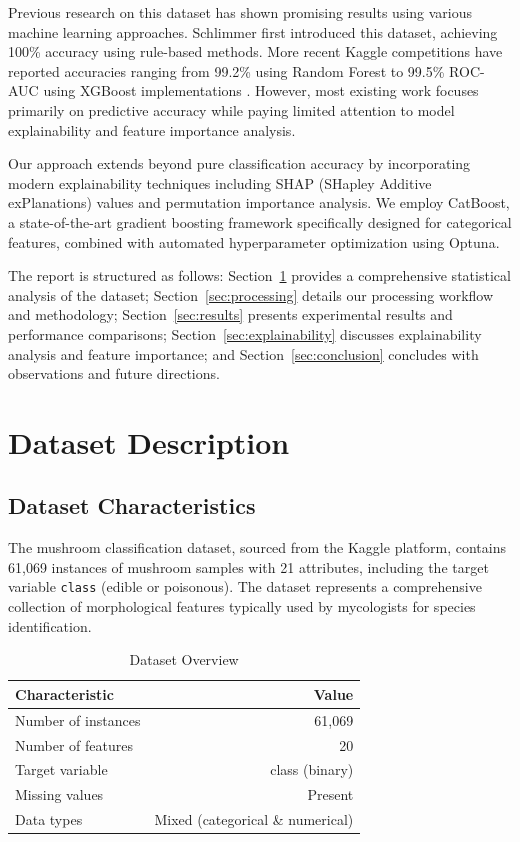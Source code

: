 \documentclass[11pt,a4paper]{article}
\begin{document}
Previous research on this dataset has shown promising results using various machine learning approaches. Schlimmer \cite{schlimmer1987concept} first introduced this dataset, achieving 100\% accuracy using rule-based methods. More recent Kaggle competitions have reported accuracies ranging from 99.2\% using Random Forest \cite{kaggle2019mushroom} to 99.5\% ROC-AUC using XGBoost implementations \cite{chen2016xgboost}. However, most existing work focuses primarily on predictive accuracy while paying limited attention to model explainability and feature importance analysis.

Our approach extends beyond pure classification accuracy by incorporating modern explainability techniques including SHAP (SHapley Additive exPlanations) values and permutation importance analysis. We employ CatBoost, a state-of-the-art gradient boosting framework specifically designed for categorical features, combined with automated hyperparameter optimization using Optuna.

The report is structured as follows: Section~\ref{sec:dataset} provides a comprehensive statistical analysis of the dataset; Section~\ref{sec:processing} details our processing workflow and methodology; Section~\ref{sec:results} presents experimental results and performance comparisons; Section~\ref{sec:explainability} discusses explainability analysis and feature importance; and Section~\ref{sec:conclusion} concludes with observations and future directions.

\section{Dataset Description}
\label{sec:dataset}

\subsection{Dataset Characteristics}

The mushroom classification dataset, sourced from the Kaggle platform, contains 61,069 instances of mushroom samples with 21 attributes, including the target variable \texttt{class} (edible or poisonous). The dataset represents a comprehensive collection of morphological features typically used by mycologists for species identification.

\begin{table}[H]
\centering
\caption{Dataset Overview}
\begin{tabular}{@{}lr@{}}
\toprule
\textbf{Characteristic} & \textbf{Value} \\
\midrule
Number of instances & 61,069 \\
Number of features & 20 \\
Target variable & class (binary) \\
Missing values & Present \\
Data types & Mixed (categorical \& numerical) \\
\bottomrule
\end{tabular}
\end{table}
\end{document}
